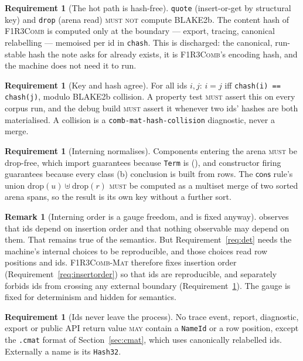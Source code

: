 \documentclass[11pt,a4paper]{article}
\newcommand{\code}[1]{\texttt{#1}}
\newcommand{\Comb}{\textsc{F1R3Comb}}
\newcommand{\Mat}{\textsc{F1R3Comb-Mat}}
\newcommand{\MUST}{\textsc{must}}
\newcommand{\MUSTNOT}{\textsc{must not}}
\newcommand{\MAY}{\textsc{may}}
\newcommand{\cons}{\mathsf{cons}}
\theoremstyle{definition}
\newtheorem{requirement}[definition]{Requirement}
\newtheorem{remark}[definition]{Remark}
\theoremstyle{plain}
\begin{document}
\begin{requirement}[The hot path is hash-free]\label{req:hashfree}
\code{quote} (insert-or-get by structural key) and \code{drop} (arena read)
\MUSTNOT{} compute BLAKE2b. The content hash of \Comb{}
\cite[Req.~4.12]{combspec} is computed only at the boundary --- export,
tracing, canonical relabelling --- memoised per id in \code{chash}. This is
\cite[Obl.~13.2]{matnote} discharged: the canonical, run-stable hash the note
asks for already exists, it is \Comb's encoding hash, and the machine does not
need it to run.
\end{requirement}

\begin{requirement}[Key and hash agree]\label{req:keyhash}
For all ids $i,j$: $i = j$ iff \code{chash(i) == chash(j)}, modulo BLAKE2b
collision. A property test \MUST{} assert this on every corpus run, and the
debug build \MUST{} assert it whenever two ids' hashes are both materialised.
A collision is a \code{comb-mat-hash-collision} diagnostic, never a merge.
\end{requirement}

\begin{requirement}[Interning normalises]\label{req:internnorm}
Components entering the arena \MUST{} be drop-free, which import guarantees
because \code{Term} is (\cite[Req.~4.4]{combspec}), and constructor firing
guarantees because every class (b) conclusion is built from rows. The
$\cons$ rule's union $\mathrm{drop}(u) \uplus \mathrm{drop}(r)$ \MUST{} be
computed as a multiset merge of two sorted arena spans, so the result is its
own key without a further sort.
\end{requirement}

\begin{remark}[Interning order is a gauge freedom, and is fixed anyway]
\cite[Rem.~4.4]{matnote} observes that ids depend on insertion order and that
nothing observable may depend on them. That remains true of the semantics.
But Requirement~\ref{req:det} needs the machine's internal choices to be
reproducible, and those choices read row positions and ids. \Mat{} therefore
fixes insertion order (Requirement~\ref{req:insertorder}) so that ids are
reproducible, and separately forbids ids from crossing any external boundary
(Requirement~\ref{req:noidleak}). The gauge is fixed for determinism and
hidden for semantics.
\end{remark}

\begin{requirement}[Ids never leave the process]\label{req:noidleak}
No trace event, report, diagnostic, export or public API return value
\MAY{} contain a \code{NameId} or a row position, except the \code{.cmat}
format of Section~\ref{sec:cmat}, which uses canonically relabelled ids.
Externally a name is its \code{Hash32}.
\end{requirement}
\end{document}
